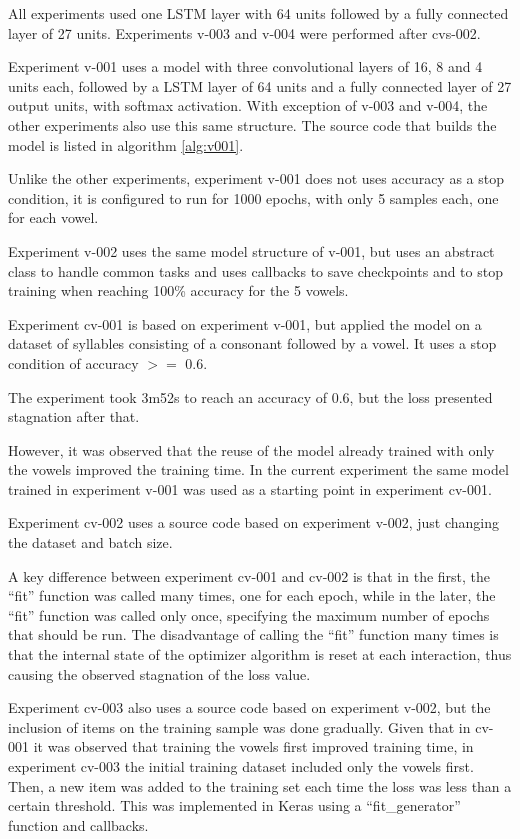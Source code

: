 

All experiments used one LSTM layer with 64 units followed by a fully connected layer of 27 units. Experiments v-003 and v-004 were performed after cvs-002.

Experiment v-001 uses a model with three convolutional layers of 16, 8 and 4 units each, followed by a LSTM layer of 64 units and a fully connected layer of 27 output units, with softmax activation. With exception of v-003 and v-004, the other experiments also use this same structure. The source code that builds the model is listed in algorithm \ref{alg:v001}.

Unlike the other experiments, experiment v-001 does not uses accuracy as a stop condition, it is configured to run for 1000 epochs, with only 5 samples each, one for each vowel.



Experiment v-002 uses the same model structure of v-001, but uses an abstract class to handle common tasks and uses callbacks to save checkpoints and to stop training when reaching 100\% accuracy for the 5 vowels.

Experiment cv-001 is based on experiment v-001, but applied the model on a dataset of syllables consisting of a consonant followed by a vowel. It uses a stop condition of accuracy $>=$ 0.6.

The experiment took 3m52s to reach an accuracy of 0.6, but the loss presented stagnation after that.

However, it was observed that the reuse of the model already trained with only the vowels improved the training time. In the current experiment the same model trained in experiment v-001 was used as a starting point in experiment cv-001.

Experiment cv-002 uses a source code based on experiment v-002, just changing the dataset and batch size.

A key difference between experiment cv-001 and cv-002 is that in the first, the ``fit'' function was called many times, one for each epoch, while in the later, the ``fit'' function was called only once, specifying the maximum number of epochs that should be run. The disadvantage of calling the ``fit'' function many times is that the internal state of the optimizer algorithm is reset at each interaction, thus causing the observed stagnation of the loss value.

Experiment cv-003 also uses a source code based on  experiment v-002, but the inclusion of items on the training sample was done gradually. Given that in cv-001 it was observed that training the vowels first improved training time, in experiment cv-003 the initial training dataset included only the vowels first. Then, a new item was added to the training set each time the loss was less than a certain threshold. This was implemented in Keras using a ``fit\_generator'' function and callbacks.

